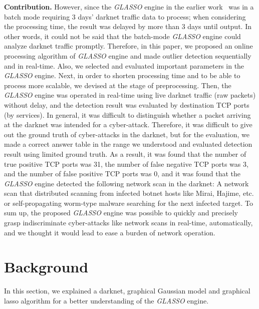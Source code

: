 \documentclass[conference]{IEEEtran}
\begin{document}
\noindent
\textbf{Contribution.}\space\space
However, since the {\it GLASSO} engine in the earlier work~\cite{Han} was in a batch mode requiring 3 days' darknet traffic data to process; when considering the processing time, the result was delayed by more than 3 days until output.
In other words, it could not be said that the batch-mode {\it GLASSO} engine could analyze darknet traffic promptly.
Therefore, in this paper, we proposed an online processing algorithm of {\it GLASSO} engine and made outlier detection sequentially and in real-time.
Also, we selected and evaluated important parameters in the {\it GLASSO} engine.
Next, in order to shorten processing time and to be able to process more scalable, we devised at the stage of preprocessing.
Then, the {\it GLASSO} engine was operated in real-time using live darknet traffic (raw packets) without delay, and the detection result was evaluated by destination TCP ports (by services).
In general, it was difficult to distinguish whether a packet arriving at the darknet was intended for a cyber-attack.
Therefore, it was difficult to give out the ground truth of cyber-attacks in the darknet, but for the evaluation, we made a correct answer table in the range we understood and evaluated detection result using limited ground truth.
As a result, it was found that the number of true positive TCP ports was 31, the number of false negative TCP ports was 3, and the number of false positive TCP ports was 0, and it was found that the {\it GLASSO} engine detected the following network scan in the darknet: A network scan that distributed scanning from infected botnet hosts like Mirai, Hajime, etc. or self-propagating worm-type malware searching for the next infected target.
To sum up, the proposed {\it GLASSO} engine was possible to quickly and precisely grasp indiscriminate cyber-attacks like network scans in real-time, automatically, and we thought it would lead to ease a burden of network operation.




\section{Background}
In this section, we explained a darknet, graphical Gaussian model and graphical lasso algorithm for a better understanding of the {\it GLASSO} engine.
\end{document}
